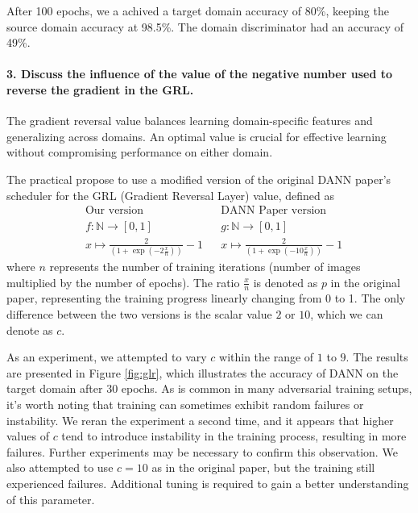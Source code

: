 After 100 epochs, we a achived a target domain accuracy of 80\%, keeping the source domain accuracy at 98.5\%. The domain discriminator had an accuracy of 49\%.


\paragraph*{3. Discuss the influence of the value of the negative number used to reverse the gradient in the GRL.}

The gradient reversal value balances learning domain-specific features and generalizing across domains. An optimal value is crucial for effective learning without compromising performance on either domain.

The practical propose to use a modified version of the original DANN paper's scheduler for the GRL (Gradient Reversal Layer) value, defined as 
\begin{align*}
    &\text{Our version} && \text{DANN Paper version}\\
    &f: \mathbb{N} \to [0,1] &&g: \mathbb{N} \to [0,1]\\
    &x \mapsto \frac{2}{(1 + \exp({-2\frac{x}{n}}))} - 1 && x \mapsto \frac{2}{(1 + \exp({-10 \frac{x}{n}}))} - 1
\end{align*}
where $n$ represents the number of training iterations (number of images multiplied by the number of epochs). The ratio $\frac{x}{n}$ is denoted as $p$ in the original paper, representing the training progress linearly changing from 0 to 1. The only difference between the two versions is the scalar value $2$ or $10$, which we can denote as $c$.

As an experiment, we attempted to vary $c$ within the range of $1$ to $9$. The results are presented in Figure \ref{fig:glr}, which illustrates the accuracy of DANN on the target domain after 30 epochs. 
As is common in many adversarial training setups, it's worth noting that training can sometimes exhibit random failures or instability. We reran the experiment a second time, and it appears that higher values of $c$ tend to introduce instability in the training process, resulting in more failures. Further experiments may be necessary to confirm this observation. We also attempted to use $c=10$ as in the original paper, but the training still experienced failures. Additional tuning is required to gain a better understanding of this parameter.

